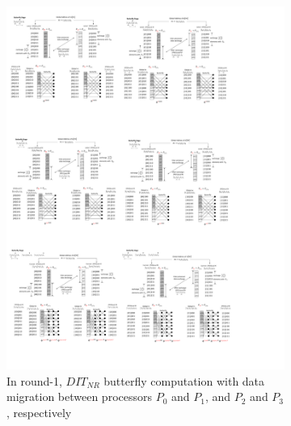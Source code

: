 \documentclass[submission]{iacrtrans}
\theoremstyle{plain}
\begin{document}
\begin{figure}[!tb]
\begin{subfigure}[b]{.95\textwidth}
\includegraphics[width=\textwidth]{./fig/DataSwapWithPerm2.pdf}
\caption{In round-1, $DIT_{NR}$ butterfly computation with data migration between processors $P_0$ and $P_1$, and $P_2$ and $P_3$, respectively}\label{fig:dataswap_with_perm2}
\end{subfigure}
\hspace{1em}
\begin{subfigure}[b]{.95\textwidth}

\end{subfigure}
\end{figure}
\end{document}
